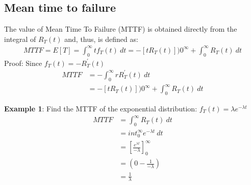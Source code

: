 \documentclass[10pt,a4paper]{article}
\begin{document}
\pagebreak
\subsection{Mean time to failure}

The value of Mean Time To Failure (MTTF) is obtained directly from the integral of $R_T(t)$ and,
thus, is defined as:
\begin{align*}
    MTTF = E[T] = \int_0^\infty tf_T(t)\: dt = -[tR_T(t)])0^\infty + \int_0^\infty R_T(t)\: dt
\end{align*}
Proof:
Since $f_T(t) = -R_T^\prime (t)$
\begin{align*}
    MTTF &= -\int_0^\infty rR_T^\prime(t) \: dt \\
    &= -[tR_T(t)])0^\infty + \int_0^\infty R_T(t)\: dt
\end{align*}

\textbf{Example 1}: Find the MTTF of the exponential distribution: $f_T(t) = \lambda e^{-\lambda t}$
\begin{align*}
    MTTF &= \int_0^\infty R_T(t) \: dt \\
    &= int_0^\infty e^{-\lambda t} \: dt \\
    &= \left[\frac{e^{\lambda t}}{-\lambda}\right]_0^\infty \\
    &= \left(0 - \frac{1}{-\lambda}\right) \\
    &= \frac{1}{\lambda}
\end{align*}

\end{document}
